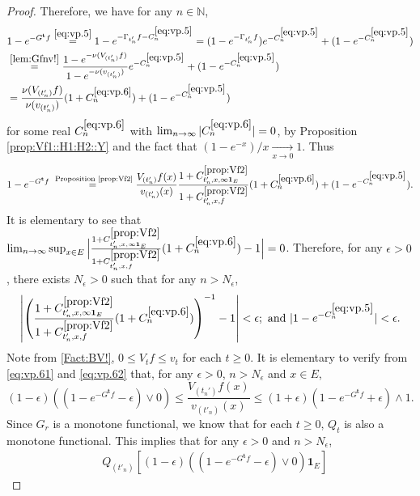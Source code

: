 \documentclass[12pt,a4paper]{amsart}
\numberwithin{equation}{section}
\theoremstyle{plain}
\theoremstyle{definition}
\theoremstyle{remark}
\begin{document}
\begin{proof}
	
Therefore, we have for any $n \in \mathbb N$,
\begin{align}
	& 1 - e^{- G^{\mathbf t}f}
	\overset{\eqref{eq:vp.5}}= 1 - e^{- \Gamma_{t'_n} f  - C^{\eqref{eq:vp.5}}_n}
	= (1 - e^{- \Gamma_{t'_n} f }) e^{- C^{\eqref{eq:vp.5}}_n} + (1 - e^{-C_n^{\eqref{eq:vp.5}}})
	\\&\overset{\eqref{lem:Gfnv!}}= \frac{1 - e^{- \nu( V_{(t_n')}f)}}{1- e^{- \nu(v_{(t_n')})}}  e^{ - C^{\eqref{eq:vp.5}}_n} + (1 - e^{-C_n^{\eqref{eq:vp.5}}})
	\\& \label{eq:vp.6}= \frac{\nu (V_{(t_n')} f)}{\nu(v_{(t_n')})}  (1+C^{\eqref{eq:vp.6}}_n) + (1 - e^{-C_n^{\eqref{eq:vp.5}}})
\end{align}
	for some real $C^{\eqref{eq:vp.6}}_n$ with $\lim_{n\to \infty} |C^{\eqref{eq:vp.6}}_n| =0$, by Proposition \ref{prop:Vf1::H1:H2::Y} and the fact that $(1- e^{-x})/x \xrightarrow[x\to 0]{}1$.
	Thus
\begin{equation} \label{eq:vp.61}
	1 - e^{- G^{\mathbf t}f}
	\overset{\text{ Proposition \ref{prop:Vf2}}}=  \frac{V_{(t_n')}f(x)}{v_{(t_n')}(x)} \frac{1+C^{\ref{prop:Vf2}}_{t_n',x,\infty \mathbf 1_E}}{1+C^{\ref{prop:Vf2}}_{t_n',x,f}} (1+C^{\eqref{eq:vp.6}}_n) + (1 - e^{-C_n^{\eqref{eq:vp.5}}}).
\end{equation}
	It is elementary to see that $\lim_{n\to \infty} \sup_{x\in E} \Big|\frac{1+C^{\ref{prop:Vf2}}_{t_n',x,\infty \mathbf 1_E}}{1+C^{\ref{prop:Vf2}}_{t_n',x,f}} (1+C^{\eqref{eq:vp.6}}_n) -1 \Big| = 0$.
	Therefore, for any $\epsilon > 0$, there exists $N_\epsilon>0$ such that for any $n>N_\epsilon$,
\begin{equation} \label{eq:vp.62}
	\left| \left(\frac{1+C^{\ref{prop:Vf2}}_{t_n',x,\infty \mathbf 1_E}}{1+C^{\ref{prop:Vf2}}_{t_n',x,f}} (1+C^{\eqref{eq:vp.6}}_n)\right)^{-1} -1 \right| < \epsilon;
	\text{~and~} |1 - e^{-C_n^{\eqref{eq:vp.5}}}| < \epsilon.
\end{equation}
	Note from \eqref{Fact:BV!}, $0 \leq V_tf \leq v_t$ for each $t\geq 0$.
	It is elementary to verify from \eqref{eq:vp.61} and \eqref{eq:vp.62} that, for any $\epsilon>0$, $n>N_\epsilon$ and $x\in E$,
\[
	(1-\epsilon) \left((1 - e^{- G^{\mathbf t}f} - \epsilon)\vee 0\right)
	\leq \frac{V_{(t_n')}f(x)}{v_{(t'_n)}(x)}
	\leq (1+\epsilon) ( 1 - e^{- G^{\mathbf t}f} + \epsilon) \wedge 1.
\]
	Since $G_r$ is a monotone functional, we know that for each $t\geq 0$, $Q_t$ is also a monotone functional.
	This implies that  for any $\epsilon>0$ and $n>N_\epsilon$,
\begin{align} \label{eq:vp.7}
	&Q_{(t'_n)} \left[(1-\epsilon) \left((1 - e^{- G^{\mathbf t}f} - \epsilon)\vee 0\right) \mathbf 1_E \right]

\end{align}
\end{proof}
\end{document}
